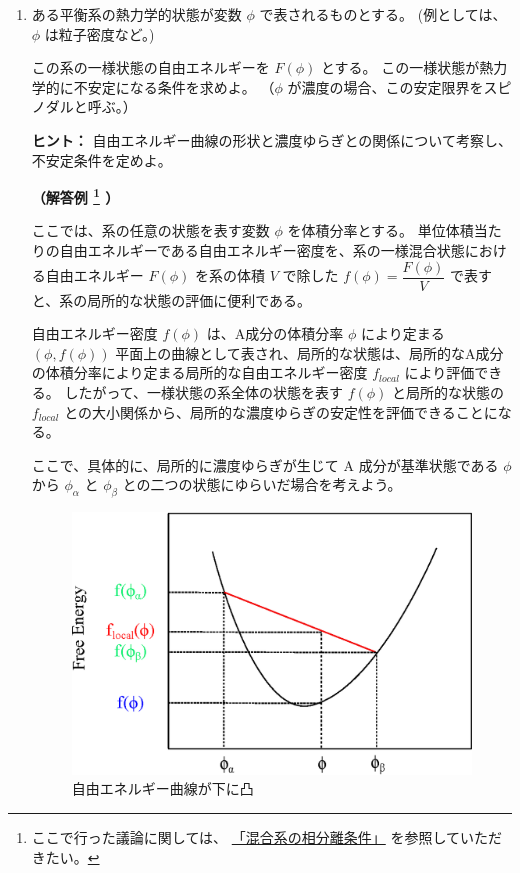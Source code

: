 \documentclass[uplatex,dvipdfmx,a4paper,11pt]{jsarticle}
\begin{document}
\begin{enumerate}
\setlength{\parskip}{0cm} %
\setlength{\itemsep}{0.5cm} %

\color{black}
\vspace{10pt}
\item
ある平衡系の熱力学的状態が変数 $\phi$ で表されるものとする。
(例としては、$\phi$ は粒子密度など。) 

この系の一様状態の自由エネルギーを $F(\phi)$ とする。
この一様状態が熱力学的に不安定になる条件を求めよ。
（$\phi$ が濃度の場合、この安定限界をスピノダルと呼ぶ。）

\begin{itembox}[l]{{\bf ヒント：}}
自由エネルギー曲線の形状と濃度ゆらぎとの関係について考察し、不安定条件を定めよ。
\end{itembox}

\vspace{10pt}
{\bf （解答例
\footnote
{
ここで行った議論に関しては、
\href{https://dl.dropboxusercontent.com/u/18899343/physics/FreeEnergyForm/Free_Energy_Form.pdf}{「混合系の相分離条件」}
を参照していただきたい。
}
）}

ここでは、系の任意の状態を表す変数 $\phi$ を体積分率とする。
単位体積当たりの自由エネルギーである自由エネルギー密度を、系の一様混合状態における自由エネルギー $F(\phi)$ を系の体積 $V$ で除した $f (\phi)= \dfrac{F(\phi)}{V}$ で表すと、系の局所的な状態の評価に便利である。

自由エネルギー密度 $f(\phi)$ は、A成分の体積分率 $\phi$ により定まる $(\phi, f(\phi) )$ 平面上の曲線として表され、局所的な状態は、局所的なA成分の体積分率により定まる局所的な自由エネルギー密度 $f_{local}$ により評価できる。
したがって、一様状態の系全体の状態を表す $f(\phi)$ と局所的な状態の $f_{local}$ との大小関係から、局所的な濃度ゆらぎの安定性を評価できることになる。

ここで、具体的に、局所的に濃度ゆらぎが生じて A 成分が基準状態である $\phi$ から $\phi_{\alpha}$ と $\phi_{\beta}$ との二つの状態にゆらいだ場合を考えよう。
\begin{figure}[htbp]
	\centering
		\includegraphics[width = 8 cm]{./figures/fig2.eps}
	\caption{自由エネルギー曲線が下に凸}
\end{figure}


\end{enumerate}
\end{document}
